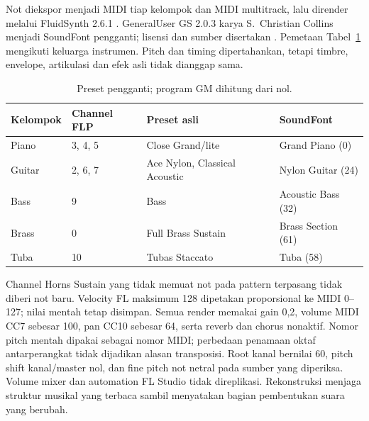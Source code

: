 Not diekspor menjadi MIDI tiap kelompok dan MIDI multitrack, lalu
dirender melalui FluidSynth 2.6.1 \cite{fluidsynth}. GeneralUser GS
2.0.3 karya S.~Christian Collins menjadi SoundFont pengganti;
lisensi dan sumber disertakan \cite{soundfont}. Pemetaan
Tabel~\ref{tab:preset} mengikuti keluarga instrumen. Pitch dan timing
dipertahankan, tetapi timbre, envelope, artikulasi dan efek asli
tidak dianggap sama.
\begin{table}[H]
\centering\small
\caption{Preset pengganti; program GM dihitung dari nol.}\label{tab:preset}
\begin{tabular}{llll}
\toprule
Kelompok & Channel FLP & Preset asli & SoundFont \\
\midrule
Piano & 3, 4, 5 & Close Grand/lite & Grand Piano (0) \\
Guitar & 2, 6, 7 & Ace Nylon, Classical Acoustic & Nylon Guitar (24) \\
Bass & 9 & Bass & Acoustic Bass (32) \\
Brass & 0 & Full Brass Sustain & Brass Section (61) \\
Tuba & 10 & Tubas Staccato & Tuba (58) \\
\bottomrule
\end{tabular}
\end{table}
Channel Horns Sustain yang tidak memuat not pada pattern terpasang
tidak diberi not baru. Velocity FL maksimum 128 dipetakan proporsional
ke MIDI 0--127; nilai mentah tetap disimpan. Semua render memakai gain
0,2, volume MIDI CC7 sebesar 100, pan CC10 sebesar 64, serta reverb
dan chorus nonaktif. Nomor pitch mentah dipakai sebagai nomor MIDI;
perbedaan penamaan oktaf antarperangkat tidak dijadikan alasan
transposisi. Root kanal bernilai 60, pitch shift kanal/master nol,
dan fine pitch not netral pada sumber yang diperiksa.
Volume mixer dan automation FL Studio tidak direplikasi. Rekonstruksi
menjaga struktur musikal yang terbaca sambil menyatakan bagian
pembentukan suara yang berubah.

